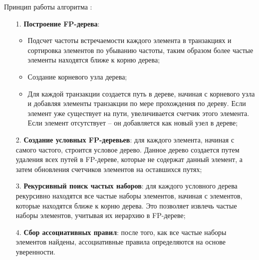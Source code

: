 Принцип работы алгоритма \cite{fpgrowth}:
\begin{enumerate}
	\item[1.] \textbf{Построение FP-дерева}:
		\begin{itemize}
			\item Подсчет частоты встречаемости каждого элемента в транзакциях и сортировка элементов по убыванию частоты, таким образом более частые элементы находятся ближе к корню дерева;
			\item Создание корневого узла дерева;
			\item Для каждой транзакции создается путь в дереве, начиная с корневого узла и добавляя элементы транзакции по мере прохождения по дереву. Если элемент уже существует на пути, увеличивается счетчик этого элемента. Если элемент отсутствует -- он добавляется как новый узел в дереве;
		\end{itemize}
	\item[2.] \textbf{Создание условных FP-деревьев}: для каждого элемента, начиная с самого частого, строится условое дерево. Данное дерево создается путем удаления всех путей в FP-дереве, которые не содержат данный элемент, а затем обновления счетчиков элементов на оставшихся путях;
	\item[3.] \textbf{Рекурсивный поиск частых наборов}: для каждого условного дерева рекурсивно находятся все частые наборы элементов, начиная с элементов, которые находятся ближе к корню дерева. Это позволяет извлечь частые наборы элементов, учитывая их иерархию в FP-дереве;
	\item[4.] \textbf{Сбор ассоциативных правил}: после того, как все частые наборы элементов найдены, ассоциативные правила определяются на основе уверенности.
\end{enumerate}
\pagebreak